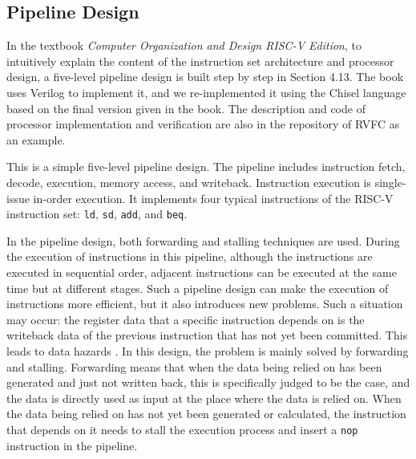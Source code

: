 \documentclass[conference]{IEEEtran}
\theoremstyle{definition}
\begin{document}
\subsection{Pipeline Design}
In the textbook \textit{Computer Organization and Design RISC-V Edition}, to intuitively explain the content of the instruction set architecture and processor design, a five-level pipeline design is built step by step in Section 4.13.
The book uses Verilog to implement it, and we re-implemented it using the Chisel language based on the final version given in the book.
The description and code of processor implementation and verification are also in the repository of RVFC \cite{riscvFvChisel} as an example.

This is a simple five-level pipeline design. 
The pipeline includes instruction fetch, decode, execution, memory access, and writeback.
Instruction execution is single-issue in-order execution.
It implements four typical instructions of the RISC-V instruction set: \verb|ld|, \verb|sd|, \verb|add|, and \verb|beq|.

In the pipeline design, both forwarding and stalling techniques are used.
During the execution of instructions in this pipeline, although the instructions are executed in sequential order, adjacent instructions can be executed at the same time but at different stages.
Such a pipeline design can make the execution of instructions more efficient, but it also introduces new problems.
Such a situation may occur: the register data that a specific instruction depends on is the writeback data of the previous instruction that has not yet been committed.
This leads to data hazards \cite{patterson2017computer}.
In this design, the problem is mainly solved by forwarding and stalling.
Forwarding means that when the data being relied on has been generated and just not written back, this is specifically judged to be the case, and the data is directly used as input at the place where the data is relied on.
When the data being relied on has not yet been generated or calculated, the instruction that depends on it needs to stall the execution process and insert a \verb|nop| instruction in the pipeline.
\end{document}
